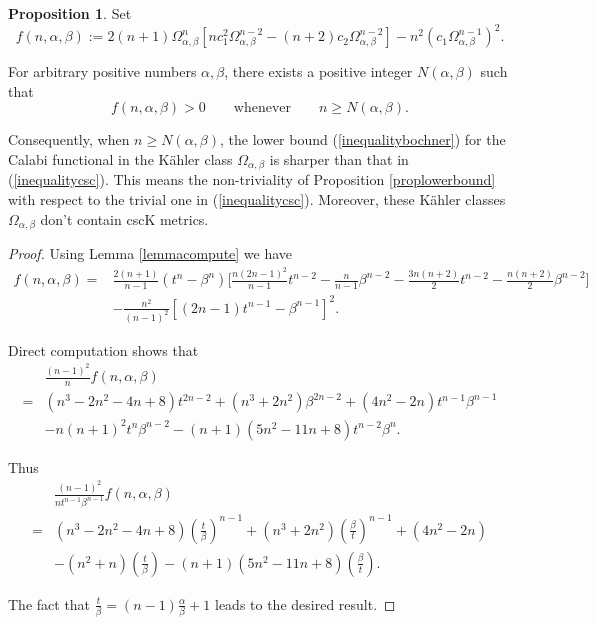\documentclass[11pt]{amsart}
\theoremstyle{definition}
\newtheorem{proposition}[theorem]{Proposition}
\theoremstyle{remark}
\numberwithin{equation}{section}
\begin{document}
\begin{proposition}\label{prop2}
Set
$$f(n,\alpha,\beta):=2(n+1)\Omega_{\alpha,\beta}^n[n
c_1^2\Omega_{\alpha,\beta}^{n-2}-(n+2)c_2
\Omega_{\alpha,\beta}^{n-2}]-n^2(c_1
\Omega_{\alpha,\beta}^{n-1})^2.$$

For arbitrary positive numbers $\alpha,\beta$, there exists a
positive integer $N(\alpha,\beta)$ such that
$$f(n,\alpha,\beta)>0
\qquad\text{whenever} \qquad n\geq N(\alpha,\beta).$$

Consequently, when $n\geq N(\alpha,\beta)$, the lower bound
(\ref{inequalitybochner}) for the Calabi functional in the
K\"{a}hler class $\Omega_{\alpha,\beta}$ is sharper than that in
(\ref{inequalitycsc}). This means the non-triviality of Proposition
\ref{proplowerbound} with respect to the trivial one in
(\ref{inequalitycsc}). Moreover, these K\"{a}hler classes
$\Omega_{\alpha,\beta}$ don't contain cscK metrics.
\end{proposition}

\begin{proof}
Using Lemma \ref{lemmacompute} we have \begin{equation}\begin{split}
f(n,\alpha,\beta)=&\frac{2(n+1)}{n-1}(t^n-\beta^n)
\big[\frac{n(2n-1)^2}{n-1}t^{n-2}-\frac{n}{n-1}\beta^{n-2}
-\frac{3n(n+2)}{2}t^{n-2}-\frac{n(n+2)}{2}\beta^{n-2}\big]\\
&- \frac{n^2}{(n-1)^2}[(2n-1)t^{n-1}-\beta^{n-1}]^2.
\end{split}\nonumber\end{equation}

Direct computation shows that
 \begin{equation}\begin{split}
&\frac{(n-1)^2}{n}f(n,\alpha,\beta)\\
=& (n^3-2n^2-4n+8)t^{2n-2}+(n^3+2n^2)\beta^{2n-2}+(4n^2-2n)t^{n-1}
\beta^{n-1}\\
&-n(n+1)^2t^n\beta^{n-2}-(n+1)(5n^2-11n+8)t^{n-2}\beta^n.
\end{split}\nonumber\end{equation}

Thus \begin{equation}\begin{split} &\frac{(n-1)^2}{nt^{n-1}\beta^{n-1}}
f(n,\alpha,\beta)\\
=&(n^3-2n^2-4n+8)(\frac{t}{\beta})^{n-1}+
(n^3+2n^2)
(\frac{\beta}{t})^{n-1}+(4n^2-2n)\\
&-(n^2+n)(\frac{t}{\beta}) -(n+1)(5n^2-11n+8)(\frac{\beta}{t}).
\end{split}\end{equation}

The fact that $\frac{t}{\beta}=(n-1)\frac{\alpha}{\beta}+1$ leads to
the desired result.
\end{proof}
\end{document}
